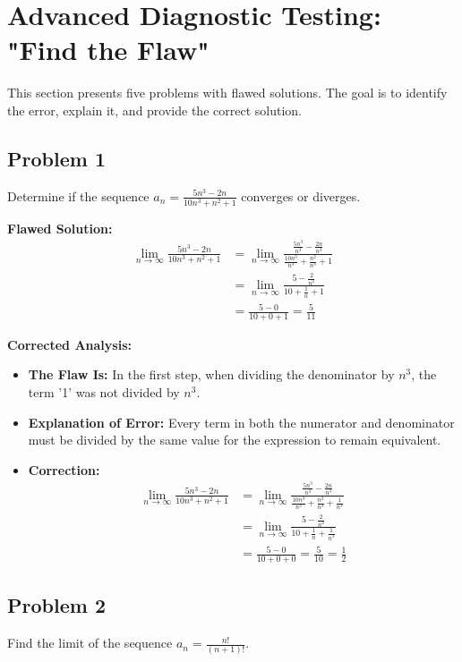 \documentclass{article}
\begin{document}
\section{Advanced Diagnostic Testing: "Find the Flaw"}

This section presents five problems with flawed solutions. The goal is to identify the error, explain it, and provide the correct solution.

\subsection{Problem 1}
Determine if the sequence $a_n = \frac{5n^3 - 2n}{10n^3 + n^2 + 1}$ converges or diverges.

\textbf{Flawed Solution:}
\begin{align*}
    \lim_{n \to \infty} \frac{5n^3 - 2n}{10n^3 + n^2 + 1} &= \lim_{n \to \infty} \frac{\frac{5n^3}{n^3} - \frac{2n}{n^3}}{\frac{10n^3}{n^3} + \frac{n^2}{n^3} + 1} \\
    &= \lim_{n \to \infty} \frac{5 - \frac{2}{n^2}}{10 + \frac{1}{n} + 1} \\
    &= \frac{5 - 0}{10 + 0 + 1} = \frac{5}{11}
\end{align*}

\textbf{Corrected Analysis:}
\begin{itemize}
    \item \textbf{The Flaw Is:} In the first step, when dividing the denominator by $n^3$, the term '1' was not divided by $n^3$.
    \item \textbf{Explanation of Error:} Every term in both the numerator and denominator must be divided by the same value for the expression to remain equivalent.
    \item \textbf{Correction:}
    \begin{align*}
        \lim_{n \to \infty} \frac{5n^3 - 2n}{10n^3 + n^2 + 1} &= \lim_{n \to \infty} \frac{\frac{5n^3}{n^3} - \frac{2n}{n^3}}{\frac{10n^3}{n^3} + \frac{n^2}{n^3} + \frac{1}{n^3}} \\
        &= \lim_{n \to \infty} \frac{5 - \frac{2}{n^2}}{10 + \frac{1}{n} + \frac{1}{n^3}} \\
        &= \frac{5 - 0}{10 + 0 + 0} = \frac{5}{10} = \frac{1}{2}
    \end{align*}
\end{itemize}


\subsection{Problem 2}
Find the limit of the sequence $a_n = \frac{n!}{ (n+1)! }$.
\end{document}
